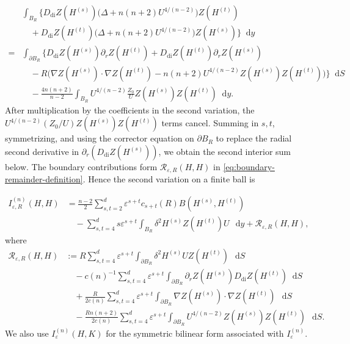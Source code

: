 \documentclass[11pt]{article}
\numberwithin{equation}{section}
\theoremstyle{remark}
\newcommand{\dd}{\mathop{}\!\mathrm{d}}
\begin{document}
{
\begin{equation*}
\begin{aligned}
 &\int_{B_R}\biggl\{
 D_{\mathrm{di}}Z(H^{(s)})
 \bigl(\Delta+n(n+2)U^{4/(n-2)}\bigr) Z(H^{(t)})\\
 &\quad+D_{\mathrm{di}}Z(H^{(t)})
 \bigl(\Delta+n(n+2)U^{4/(n-2)}\bigr) Z(H^{(s)})\biggr\}\dd y\\
 {}={}&\int_{\partial B_R}\biggl\{
 D_{\mathrm{di}}Z(H^{(s)})\partial_r Z(H^{(t)})
 +D_{\mathrm{di}}Z(H^{(t)})\partial_r Z(H^{(s)})\\
 &\quad-R\bigl(\nabla Z(H^{(s)})\mathbin{\cdot}\nabla Z(H^{(t)})
       -n(n+2)U^{4/(n-2)}Z(H^{(s)})Z(H^{(t)})\bigr)\biggr\}\dd S\\
 &\quad-\frac{4n(n+2)}{n-2}\int_{B_R}
 U^{4/(n-2)}\frac{Z_0}{U}Z(H^{(s)})Z(H^{(t)})\dd y.
\end{aligned}
\end{equation*}
}
 After multiplication by the
coefficients in the second variation, the
$U^{4/(n-2)}(Z_0/U)Z(H^{(s)})Z(H^{(t)})$ terms cancel.  Summing in
$s,t$, symmetrizing, and using the corrector equation on $\partial B_R$
to replace the radial second derivative in
$\partial_r(D_{\mathrm{di}}Z(H^{(s)}))$, we obtain the second interior sum
below.  The boundary contributions form
$\mathcal R_{\varepsilon,R}(H,H)$ in
\eqref{eq:boundary-remainder-definition}.  Hence the second variation
on a finite ball is

{
\begin{equation}\label{eq:truncated-pohozaev-expansion}
\begin{aligned}
 I_{\varepsilon,R}^{(n)}(H,H)
 &=\frac{n-2}{2}\sum_{s,t=2}^d
 \varepsilon^{s+t}c_{s+t}(R)B(H^{(s)},H^{(t)})\\
 &\quad-\sum_{s,t=4}^d s\varepsilon^{s+t}
 \int_{B_R}\delta^2H^{(s)}Z(H^{(t)})U\,\dd y
 +\mathcal R_{\varepsilon,R}(H,H),
\end{aligned}
\end{equation}
}
 where
{
\begin{equation}\label{eq:boundary-remainder-definition}
\begin{aligned}
 \mathcal R_{\varepsilon,R}(H,H)
 &:=R\sum_{s,t=4}^d\varepsilon^{s+t}
 \int_{\partial B_R}\delta^2H^{(s)}U Z(H^{(t)})\,\dd S\\
 &\quad-c(n)^{-1}\sum_{s,t=4}^d\varepsilon^{s+t}
 \int_{\partial B_R}\partial_r Z(H^{(s)})
 D_{\mathrm{di}}Z(H^{(t)})\dd S\\
 &\quad+\frac{R}{2c(n)}\sum_{s,t=4}^d\varepsilon^{s+t}
 \int_{\partial B_R}
 \nabla Z(H^{(s)})\mathbin{\cdot}\nabla Z(H^{(t)})
 \,\dd S\\
 &\quad-\frac{Rn(n+2)}{2c(n)}\sum_{s,t=4}^d\varepsilon^{s+t}
 \int_{\partial B_R}U^{4/(n-2)}Z(H^{(s)})Z(H^{(t)})\,\dd S.
\end{aligned}
\end{equation}
}
We also use $I_\varepsilon^{(n)}(H,K)$ for the symmetric bilinear form
associated with $I_\varepsilon^{(n)}$.
\end{document}
